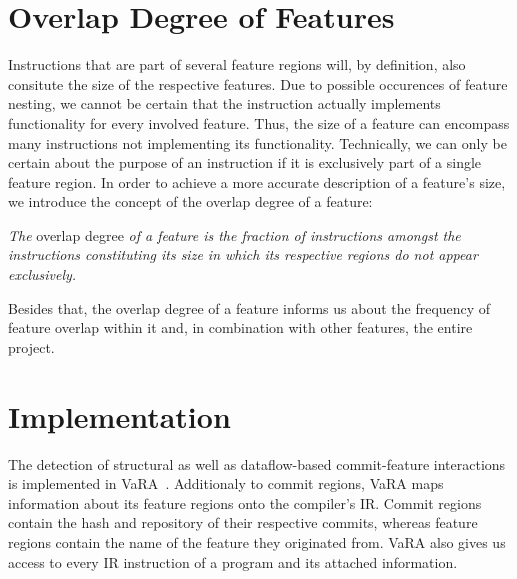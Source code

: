\section{Overlap Degree of Features}\label{sec:feature_overlap_degree}
Instructions that are part of several feature regions will, by definition, also consitute the size of the respective features.
Due to possible occurences of feature nesting, we cannot be certain that the instruction actually implements functionality for every involved feature.
Thus, the size of a feature can encompass many instructions not implementing its functionality.
Technically, we can only be certain about the purpose of an instruction if it is exclusively part of a single feature region.
In order to achieve a more accurate description of a feature's size, we introduce the concept of the overlap degree of a feature:
\begin{definition} \label{def:feature_overlap_degree}
\emph{The} overlap degree \emph{of a feature is the fraction of instructions amongst the instructions constituting its size in which its respective regions do not appear exclusively.}
\end{definition}
Besides that, the overlap degree of a feature informs us about the frequency of feature overlap within it and, in combination with other features, the entire project.

\section{Implementation}\label{ch:implementation}

The detection of structural as well as dataflow-based commit-feature interactions is implemented in VaRA~\cite{VaRA2023}.
Additionaly to commit regions, VaRA maps information about its feature regions onto the compiler's IR.
Commit regions contain the hash and repository of their respective commits, whereas feature regions contain the name of the feature they originated from.
VaRA also gives us access to every IR instruction of a program and its attached information.

